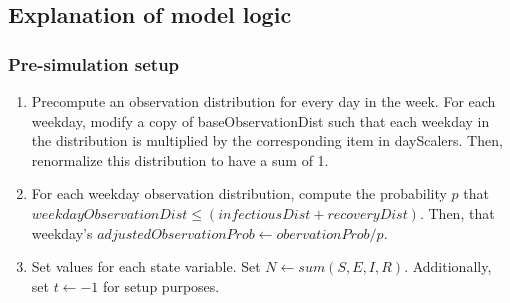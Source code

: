 \documentclass{article}
\begin{document}
\subsection{Explanation of model logic}
\subsubsection{Pre-simulation setup}

\begin{enumerate}
    \item Precompute an observation distribution for every day in the week. For each weekday, modify a copy of baseObservationDist such that each weekday in the distribution is multiplied by the corresponding item in dayScalers. Then, renormalize this distribution to have a sum of 1.

    \item For each weekday observation distribution, compute the probability $p$ that $weekdayObservationDist \leq (infectiousDist+recoveryDist)$. Then, that weekday's $adjustedObservationProb \gets obervationProb/p$. 
    
    \item Set values for each state variable. Set $N \gets sum(S, E, I, R)$. Additionally, set $t \gets -1$ for setup purposes.

\end{enumerate}
\end{document}
